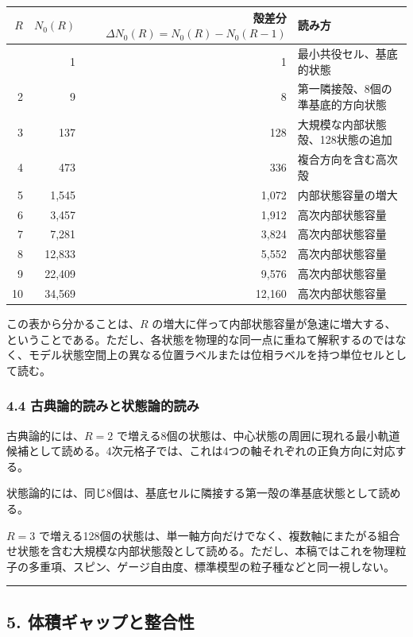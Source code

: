 \documentclass[
]{ltjsarticle}
\newcounter{none} %
\begin{document}
{\def\LTcaptype{none} %
\begin{longtable}[]{@{}rrrl@{}}
\toprule\noalign{}
\(R\) & \(N_0(R)\) & 殻差分 \(\Delta N_0(R)=N_0(R)-N_0(R-1)\) &
読み方 \\
\midrule\noalign{}
\endhead
\bottomrule\noalign{}
\endlastfoot
1 & 1 & 1 & 最小共役セル、基底的状態 \\
2 & 9 & 8 & 第一隣接殻、8個の準基底的方向状態 \\
3 & 137 & 128 & 大規模な内部状態殻、128状態の追加 \\
4 & 473 & 336 & 複合方向を含む高次殻 \\
5 & 1,545 & 1,072 & 内部状態容量の増大 \\
6 & 3,457 & 1,912 & 高次内部状態容量 \\
7 & 7,281 & 3,824 & 高次内部状態容量 \\
8 & 12,833 & 5,552 & 高次内部状態容量 \\
9 & 22,409 & 9,576 & 高次内部状態容量 \\
10 & 34,569 & 12,160 & 高次内部状態容量 \\
\end{longtable}
}

この表から分かることは、\(R\)
の増大に伴って内部状態容量が急速に増大する、ということである。ただし、各状態を物理的な同一点に重ねて解釈するのではなく、モデル状態空間上の異なる位置ラベルまたは位相ラベルを持つ単位セルとして読む。

\subsubsection{4.4
古典論的読みと状態論的読み}\label{ux53e4ux5178ux8ad6ux7684ux8aadux307fux3068ux72b6ux614bux8ad6ux7684ux8aadux307f}

古典論的には、\(R=2\)
で増える8個の状態は、中心状態の周囲に現れる最小軌道候補として読める。4次元格子では、これは4つの軸それぞれの正負方向に対応する。

状態論的には、同じ8個は、基底セルに隣接する第一殻の準基底状態として読める。

\(R=3\)
で増える128個の状態は、単一軸方向だけでなく、複数軸にまたがる組合せ状態を含む大規模な内部状態殻として読める。ただし、本稿ではこれを物理粒子の多重項、スピン、ゲージ自由度、標準模型の粒子種などと同一視しない。

\begin{center}\rule{0.5\linewidth}{0.5pt}\end{center}

\subsection{5.
体積ギャップと整合性}\label{ux4f53ux7a4dux30aeux30e3ux30c3ux30d7ux3068ux6574ux5408ux6027}
\end{document}
